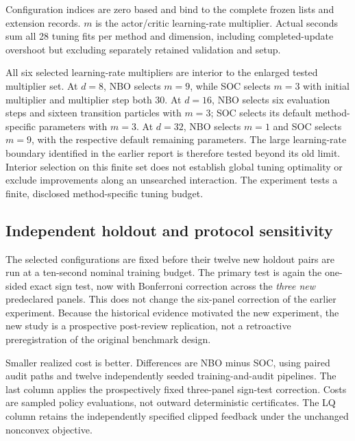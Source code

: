 \begin{table}[t]\centering\small
\caption{Selected configurations and actual tuning-training opportunity}\label{r11:tab:tuning}

\par\smallskip\footnotesize Configuration indices are zero based and bind to the complete frozen lists and extension records. $m$ is the actor/critic learning-rate multiplier. Actual seconds sum all 28 tuning fits per method and dimension, including completed-update overshoot but excluding separately retained validation and setup.
\end{table}

All six selected learning-rate multipliers are interior to the enlarged tested multiplier set. At $d=8$, NBO selects $m=9$, while SOC selects $m=3$ with initial multiplier and multiplier step both 30. At $d=16$, NBO selects six evaluation steps and sixteen transition particles with $m=3$; SOC selects its default method-specific parameters with $m=3$. At $d=32$, NBO selects $m=1$ and SOC selects $m=9$, with the respective default remaining parameters. The large learning-rate boundary identified in the earlier report is therefore tested beyond its old limit. Interior selection on this finite set does not establish global tuning optimality or exclude improvements along an unsearched interaction. The experiment tests a finite, disclosed method-specific tuning budget.

\subsection{Independent holdout and protocol sensitivity}
The selected configurations are fixed before their twelve new holdout pairs are run at a ten-second nominal training budget. The primary test is again the one-sided exact sign test, now with Bonferroni correction across the \emph{three new} predeclared panels. This does not change the six-panel correction of the earlier experiment. Because the historical evidence motivated the new experiment, the new study is a prospective post-review replication, not a retroactive preregistration of the original benchmark design.

\begin{table}[t]\centering\scriptsize
\caption{New holdout after equal-budget method-specific tuning}\label{r11:tab:robustness}

\par\smallskip\footnotesize Smaller realized cost is better. Differences are NBO minus SOC, using paired audit paths and twelve independently seeded training-and-audit pipelines. The last column applies the prospectively fixed three-panel sign-test correction. Costs are sampled policy evaluations, not outward deterministic certificates. The LQ column retains the independently specified clipped feedback under the unchanged nonconvex objective.
\end{table}

